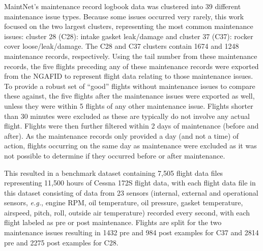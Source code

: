 \documentclass[letterpaper]{article} %
\newcommand{\hong}[1]{\textcolor{orange}{{\it [Hong: #1]}}}
\newcommand{\eg}{{\textit{e.g.}}}
\begin{document}
MaintNet's maintenance record logbook data was clustered into 39 different maintenance issue types. Because some issues occurred very rarely, this work focused on the two largest clusters, representing the most common maintenance issues: cluster 28 (C28): intake gasket leak/damage and cluster 37 (C37): rocker cover loose/leak/damage. The C28 and C37 clusters contain 1674 and 1248 maintenance records, respectively. Using the tail number from these maintenance records, the five flights preceding any of these maintenance records were exported from the NGAFID to represent flight data relating to those maintenance issues.  To provide a robust set of ``good'' flights without maintenance issues to compare these against, the five flights after the maintenance issues were exported as well, unless they were within 5 flights of any other maintenance issue. Flights shorter than 30 minutes were excluded as these are typically do not involve any actual flight. Flights were then further filtered within 2 days of maintenance (before and after). As the maintenance records only provided a day (and not a time) of action, flights occurring on the same day as maintenance were excluded as it was not possible to determine if they occurred before or after maintenance.


This resulted in a benchmark dataset containing 7,505 flight data files representing 11,500 hours of Cessna 172S flight data, with each flight data file in this dataset consisting of data from 23 sensors (internal, external and operational sensors, \eg, engine RPM, oil temperature, oil pressure, gasket temperature, airspeed, pitch, roll, outside air temperature) recorded every second, with each flight labeled as pre or post maintenance. Flights are split for the two maintenance issues resulting in 1432 pre and 984 post examples for C37 and 2814 pre and 2275 post examples for C28.
\end{document}
